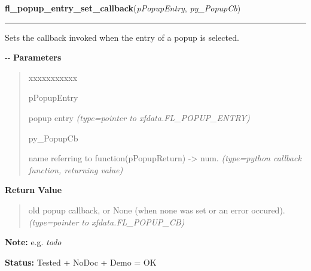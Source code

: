 \hspace{.8\funcindent}\begin{boxedminipage}{\funcwidth}

    \raggedright \textbf{fl\_popup\_entry\_set\_callback}(\textit{pPopupEntry}, \textit{py\_PopupCb})

    \vspace{-1.5ex}

    \rule{\textwidth}{0.5\fboxrule}
\setlength{\parskip}{2ex}

Sets the callback invoked when the entry of a popup is selected.

-{}-
\setlength{\parskip}{1ex}
      \textbf{Parameters}
      \vspace{-1ex}

      \begin{quote}
        \begin{Ventry}{xxxxxxxxxxx}

          \item[pPopupEntry]


popup entry
            {\it (type=pointer to xfdata.FL\_POPUP\_ENTRY)}

          \item[py\_PopupCb]


name referring to function(pPopupReturn) -> num.
            {\it (type=python callback function, returning value)}

        \end{Ventry}

      \end{quote}

      \textbf{Return Value}
    \vspace{-1ex}

      \begin{quote}

old popup callback, or None (when none was set or an error
occured).
      {\it (type=pointer to xfdata.FL\_POPUP\_CB)}

      \end{quote}

\textbf{Note:} 
e.g. \emph{todo}


\textbf{Status:} 
Tested + NoDoc + Demo = OK


    \end{boxedminipage}

    \label{xformslib:flpopup:fl_popup_entry_set_enter_callback}

